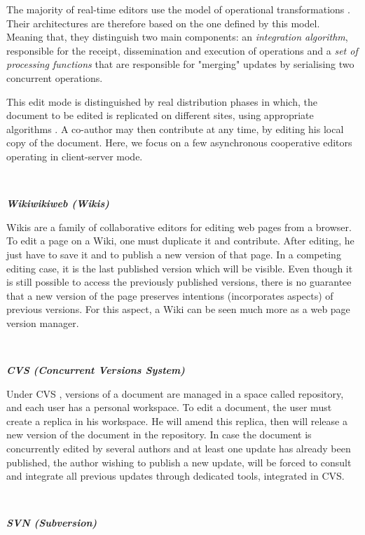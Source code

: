 The majority of real-time editors use the model of operational transformations \cite{theseOster, theseMounir}. Their architectures are therefore based on the one defined by this model. Meaning that, they distinguish two main components: an \textit{integration algorithm}, responsible for the receipt, dissemination and execution of operations and a \textit{set of processing functions} that are responsible for "merging" updates by serialising two concurrent operations.

\label{chap2:sec:async-cooperative-editing}
This edit mode is distinguished by real distribution phases in which, the document to be edited is replicated on different sites, using appropriate algorithms \cite{Yasushi2005}. A co-author may then contribute at any time, by editing his local copy of the document. Here, we focus on a few asynchronous cooperative editors operating in client-server mode.

~

\noindent\textbf{\textit{Wikiwikiweb (Wikis)}}

Wikis \cite{wikiwikiweb} are a family of collaborative editors for editing web pages from a browser. To edit a page on a Wiki, one must duplicate it and contribute. After editing, he just have to save it and to publish a new version of that page. In a competing editing case, it is the last published version which will be visible. Even though it is still possible to access the previously published versions, there is no guarantee that a new version of the page preserves intentions (incorporates aspects) of previous versions. For this aspect, a Wiki can be seen much more as a web page version manager.

~

\noindent\textbf{\textit{CVS (Concurrent Versions System)}}

Under CVS \cite{cvs}, versions of a document are managed in a space called repository, and each user has a personal workspace.
To edit a document, the user must create a replica in his workspace. He will amend this replica, then will release a new version of the document in the repository. In case the document is concurrently edited by several authors and at least one update has already been published, the author wishing to publish a new update, will be forced to consult and integrate all previous updates through  dedicated tools, integrated in CVS.

~

\noindent\textbf{\textit{SVN (Subversion)}}

